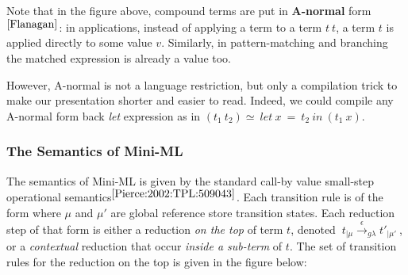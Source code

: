 \documentclass[a4paper,11pt,oneside]{article}
\theoremstyle{plain}
\newcommand{\gevalh}[4]{~#1_{|#2} \stackrel{\epsilon}{\rightarrow}_{g\lambda} #3_{|#4} ~}
\begin{document}
	Note that in the figure above, compound terms are put in \textbf{A-normal} form$^{\cite{Flanagan}}$: in applications, instead of applying a term to a term $t~t$, a term $t$ is applied directly to some value $v$. 
	Similarly, in pattern-matching and branching the matched expression is already a value too. 
	 
	 However, A-normal is not a language restriction, but only a compilation trick to make our presentation shorter and easier to read. 
	Indeed, we could compile any A-normal form back \textit{let} expression as in $(t_1~t_2) \simeq~let~x~=~t_2~in~(t_1~x)$.
	
	
\subsubsection{The Semantics of Mini-ML }
	The semantics of Mini-ML is given by the standard call-by value small-step operational semantics{\footnotesize$^{ \cite[p.~54]{Pierce:2002:TPL:509043}}$}.  
	Each transition rule is of the form  where $\mu$ and $\mu'$ are global reference store transition states. 
	Each reduction step of that form is either a reduction \textit{on the top} of term $t$, denoted  $\gevalh{t}{\mu}{t'}{\mu'}$, or a \textit{contextual} reduction that occur \textit{inside a sub-term  } of $t$. 
  The set of transition rules for the reduction on the top is given in the figure below:
\end{document}
